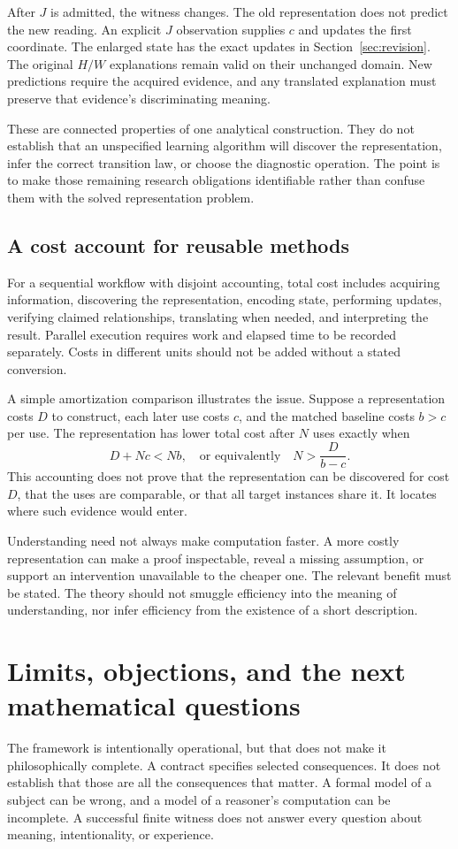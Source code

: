 \documentclass[11pt,letterpaper]{article}
\theoremstyle{plain}
\theoremstyle{definition}
\begin{document}
After $J$ is admitted, the witness changes. The old representation does not predict the new reading. An explicit $J$ observation supplies $c$ and updates the first coordinate. The enlarged state has the exact updates in Section~\ref{sec:revision}. The original $H/W$ explanations remain valid on their unchanged domain. New predictions require the acquired evidence, and any translated explanation must preserve that evidence's discriminating meaning.

These are connected properties of one analytical construction. They do not establish that an unspecified learning algorithm will discover the representation, infer the correct transition law, or choose the diagnostic operation. The point is to make those remaining research obligations identifiable rather than confuse them with the solved representation problem.

\subsection{A cost account for reusable methods}
For a sequential workflow with disjoint accounting, total cost includes acquiring information, discovering the representation, encoding state, performing updates, verifying claimed relationships, translating when needed, and interpreting the result. Parallel execution requires work and elapsed time to be recorded separately. Costs in different units should not be added without a stated conversion.

A simple amortization comparison illustrates the issue. Suppose a representation costs $D$ to construct, each later use costs $c$, and the matched baseline costs $b>c$ per use. The representation has lower total cost after $N$ uses exactly when
\[
D+Nc<Nb,\quad\text{or equivalently}\quad N>\frac{D}{b-c}.
\]
This accounting does not prove that the representation can be discovered for cost $D$, that the uses are comparable, or that all target instances share it. It locates where such evidence would enter.

Understanding need not always make computation faster. A more costly representation can make a proof inspectable, reveal a missing assumption, or support an intervention unavailable to the cheaper one. The relevant benefit must be stated. The theory should not smuggle efficiency into the meaning of understanding, nor infer efficiency from the existence of a short description.

\section{Limits, objections, and the next mathematical questions}\label{sec:limits}
The framework is intentionally operational, but that does not make it philosophically complete. A contract specifies selected consequences. It does not establish that those are all the consequences that matter. A formal model of a subject can be wrong, and a model of a reasoner's computation can be incomplete. A successful finite witness does not answer every question about meaning, intentionality, or experience.
\end{document}
